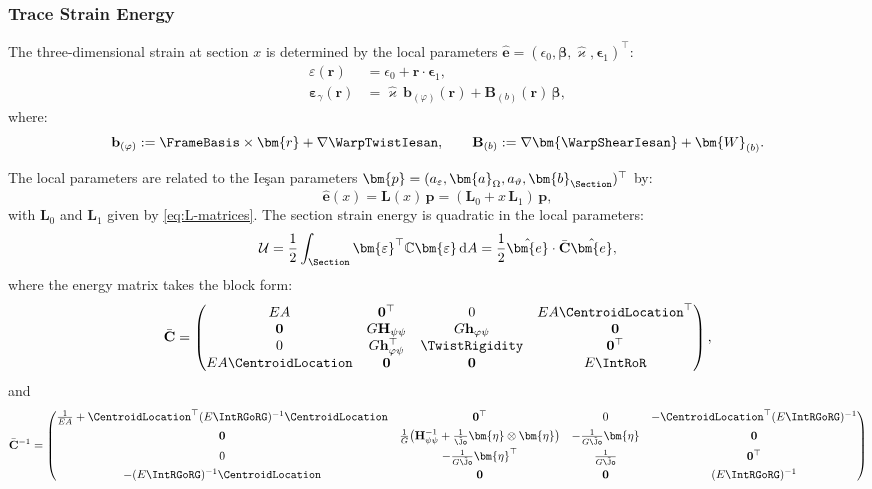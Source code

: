 \subsubsection{Trace Strain Energy}
The three-dimensional strain at section $x$ is determined by the local 
parameters $\hat{\bm{e}} = (\epsilon_0, \bm{\beta}, \hat{\varkappa}, \bm{\epsilon}_1)^\top$:
\begin{align}
\varepsilon(\bm{r}) &= \epsilon_0 + \bm{r} \cdot \bm{\epsilon}_1, \\
\bm{\varepsilon}_\gamma(\bm{r}) &= \hat{\varkappa}\,\mathbf{b}_{(\varphi)}(\bm{r}) + \mathbf{B}_{(b)}(\bm{r})\,\bm{\beta},
\end{align}
where:
\begin{equation}
\mathbf{b}_{(\varphi)} := \FrameBasis \times \bm{r} + \nabla\WarpTwistIesan, \qquad 
\mathbf{B}_{(b)} := \nabla\bm{\WarpShearIesan} + \bm{W}_{(b)}.
\end{equation}

The local parameters are related to the Ieşan parameters 
$\bm{p} = (a_\varepsilon, \bm{a}_\Omega, a_\vartheta, \bm{b}_{\Section})^\top$ by:
\begin{equation}
\hat{\bm{e}}(x) = \mathbf{L}(x)\,\bm{p} = (\mathbf{L}_0 + x\,\mathbf{L}_1)\,\bm{p},
\end{equation}
with $\mathbf{L}_0$ and \(\mathbf{L}_1\) given by \eqref{eq:L-matrices}. 
%
The section strain energy is quadratic in the local parameters:
\begin{equation}
\mathcal{U} = \frac{1}{2}\int_\Section \bm{\varepsilon}^\top \mathbb{C} \bm{\varepsilon} \, \mathrm{d}A 
= \frac{1}{2}\hat{\bm{e}} \cdot \bar{\mathbf{C}} \hat{\bm{e}},
\end{equation}
where the energy matrix takes the block form:
\begin{equation}
\bar{\mathbf{C}} = \begin{pmatrix}
EA & \mathbf{0}^\top & 0 & EA\CentroidLocation^\top \\
\mathbf{0} & G\mathbf{H}_{\psi\psi} & G\mathbf{h}_{\varphi\psi} & \mathbf{0} \\
0 & G\mathbf{h}_{\varphi\psi}^\top & \TwistRigidity & \mathbf{0}^\top \\
EA\CentroidLocation & \mathbf{0} & \mathbf{0} & E\IntRoR
\end{pmatrix},
\label{eq:energy-matrix}
\end{equation}
and
\begin{equation}
\bar{\mathbf{C}}^{-1} = \begin{pmatrix}
\frac{1}{EA} + \CentroidLocation^\top(E\IntRGoRG)^{-1}\CentroidLocation & \mathbf{0}^\top & 0 & -\CentroidLocation^\top(E\IntRGoRG)^{-1} \\[4pt]
\mathbf{0} & \frac{1}{G}\big(\mathbf{H}_{\psi\psi}^{-1} + \frac{1}{\tilde{\Jo}}\bm{\eta}\otimes\bm{\eta}\big) & -\frac{1}{G\tilde{\Jo}}\bm{\eta} & \mathbf{0} \\[4pt]
0 & -\frac{1}{G\tilde{\Jo}}\bm{\eta}^\top & \frac{1}{G\tilde{\Jo}} & \mathbf{0}^\top \\[4pt]
-(E\IntRGoRG)^{-1}\CentroidLocation & \mathbf{0} & \mathbf{0} & (E\IntRGoRG)^{-1}
\end{pmatrix}
\end{equation}

